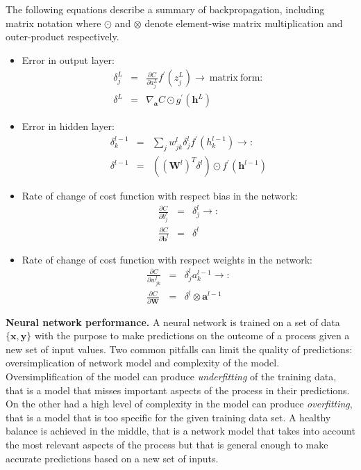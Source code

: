 \documentclass[11pt,onecolumn]{article}
\begin{document}
The following equations describe a summary of backpropagation, including matrix notation where $\odot$ and $\otimes$
denote element-wise matrix multiplication and outer-product respectively.

\begin{itemize}
  	\item Error in output layer: 
	\begin{eqnarray}
	        \delta^{L}_{j} &=& \frac{ \partial C}{\partial a^{L}_{j}}f^{'}\left( {z}^{L}_{j}\right) \rightarrow \mathrm{~matrix ~ form:} \\
		\delta^{L} &=& \nabla_{\mathbf{a}}C \odot g^{'}\left( \mathbf{h}^{L} \right) 
	\end{eqnarray} 
	\item Error in hidden layer: 
	\begin{eqnarray}
		\delta^{l-1}_{k} &=& \sum_{j}w^{l}_{jk}\delta^{l}_{j}f^{'}\left( h^{l-1}_k \right) \rightarrow : \\
		\delta^{l-1} &=& \left(\left(\mathbf{W}^{l}\right)^{T}\delta^{l} \right) \odot f^{'}\left( \mathbf{h}^{l-1}\right) 
	\end{eqnarray}
	\item Rate of change of cost function with respect bias in the network:  
	\begin{eqnarray}
		\frac{\partial C}{\partial b^{l}_{j} } &=& \delta^{l}_{j} \rightarrow : \\
		\frac{\partial C}{\partial \mathbf{b}^{l} } &=& \delta^{l}
	\end{eqnarray}
	\item Rate of change of cost function with respect weights in the network: 
	\begin{eqnarray}
	 	\frac{\partial C}{\partial w^{l}_{jk} } &=& \delta^{l}_{j} a^{l-1}_{k}\rightarrow : \\
		\frac{\partial C}{\partial \mathbf{W}} &=& \delta^{l} \otimes \mathbf{a}^{l-1} 
	\end{eqnarray} 
\end{itemize}

\textbf{Neural network performance.} A neural network is trained on a set of data 
$\{\mathbf{x},\mathbf{y}\}$ with the purpose to make predictions on the outcome of a 
process given a new set of input values. Two common pitfalls can limit the quality of predictions: 
oversimplication of network model and complexity of the model. Oversimplification of the model 
can produce \textit{underfitting} of the training data, that is a model that misses important aspects of 
the process in their predictions. On the other had a high level of complexity in the model 
can produce \textit{overfitting}, that is a model that is too specific for the given training data set. 
A healthy balance is achieved in the middle, that is a network model that takes into account the most 
relevant aspects of the process but that is general enough to make accurate predictions based on a 
new set of inputs. 
\end{document}
